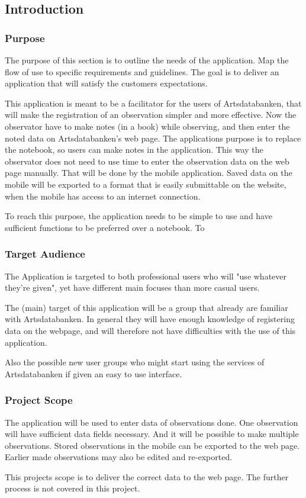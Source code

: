 \subsection{Introduction}
\subsubsection{ Purpose}
	The purpose of this section is to outline the needs of the application. Map the flow of use to specific requirements and guidelines. The goal is to deliver an application that will satisfy the customers expectations.  

This application is meant to be a facilitator for the users of Artsdatabanken, that will make the registration of an observation simpler and more effective. Now the observator have to make notes (in a book) while observing, and then enter the noted data on Artsdatabanken's web page. The applications purpose is to replace the notebook, so users can make notes in the application. This way the observator does not need to use time to enter the observation data on the web page manually. That will be done by the mobile application. Saved data on the mobile will be exported to a format that is easily submittable on the website, when the mobile has access to an internet connection.

To reach this purpose, the application needs to be simple to use and have sufficient functions to be preferred over a notebook. 
To  
\subsubsection{ Target Audience}
	The Application is targeted to both professional users who will "use whatever they're given", yet have different main focuses than more casual users.

	The (main) target of this application will be a group that already are familiar with Artsdatabanken. In general they will have enough knowledge of registering data on the webpage, and will therefore not have difficulties with the use of this application. 

	Also the possible new user groups who might start using the services of Artsdatabanken if given an easy to use interface.


\subsubsection{ Project Scope}
The application will be used to enter data of observations done. One observation will have sufficient data fields necessary. And it will be possible to make multiple observations. Stored observations in the mobile can be exported to the web page. Earlier made observations may also be edited and re-exported.

	This projects scope is to deliver the correct data to the web page. The further process is not covered in this project.
